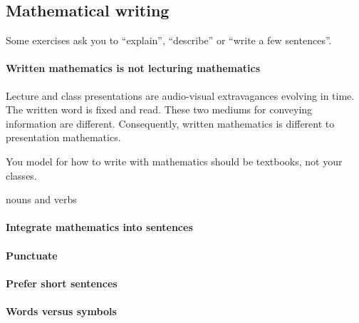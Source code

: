 \begin{draft}
\section{Mathematical writing}
\label{sec:write}

\secttoc

\begin{comment}
\cite{Higham98} Chapters 3 and~4: dos and don'ts; etc.
\cite{Zobel04}
\end{comment}

Some exercises ask you to ``explain'', ``describe'' or ``write a few sentences''.

\paragraph{Written mathematics is not lecturing mathematics}
Lecture and class presentations are audio-visual extravagances evolving in time.
The written word is fixed and read.
These two mediums for conveying information are different.
Consequently, written mathematics is different to presentation mathematics.

You model for how to write with mathematics should be textbooks, not your classes.



nouns and verbs



\paragraph{Integrate mathematics into sentences}



\paragraph{Punctuate}



\paragraph{Prefer short sentences}



\paragraph{Words versus symbols}




\end{draft}

